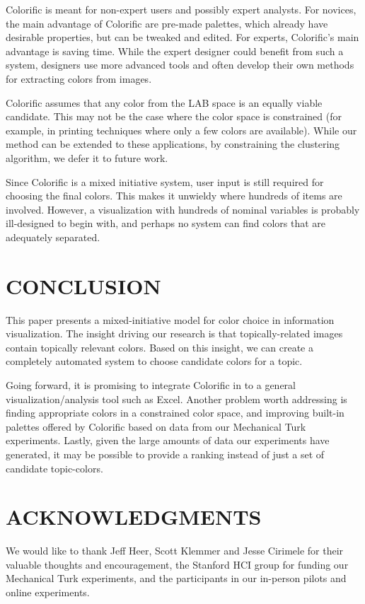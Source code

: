 \documentclass{article}
\newcommand{\system}{Colorific\xspace}
\begin{document}
 \system is meant for non-expert users and possibly expert analysts. 
 For novices, the main advantage of \system are pre-made palettes, which already have desirable properties, but can be tweaked and edited. For experts, \system's main advantage is saving time. While the expert designer could  benefit from such a system, designers use more advanced tools and often develop their own methods for extracting colors from images.
 
 \system assumes that any color from the LAB space is an equally viable candidate. This may not be the case where the color space is constrained (for example, in printing techniques where only a few colors are available). While our method can be extended to these applications, by constraining the clustering algorithm,  we defer it to future work.

 Since \system is a mixed initiative system, user input is still required for choosing the final colors. This makes it unwieldy where hundreds of items are involved. However, a visualization with hundreds of nominal variables is probably ill-designed to begin with, and perhaps no system can find colors that are adequately separated.

\section{CONCLUSION}
This paper presents a mixed-initiative model for color choice in information visualization. The insight driving our research is that topically-related images contain topically relevant colors. Based on this insight, we can create a completely automated system to choose candidate colors for a topic.

Going forward, it is promising to integrate \system in to a general visualization/analysis tool such as Excel. Another problem worth addressing is finding appropriate colors in a constrained color space, and improving built-in palettes offered by \system based on data from our Mechanical Turk experiments. Lastly, given the large amounts of data our experiments have generated, it may be possible to provide a ranking instead of just a set of candidate topic-colors.

\section{ACKNOWLEDGMENTS} 
We would like to thank Jeff Heer, Scott Klemmer and Jesse Cirimele for their valuable thoughts and encouragement, the Stanford HCI group for funding our Mechanical Turk experiments, and the participants in our in-person pilots and online experiments.





\end{document}
